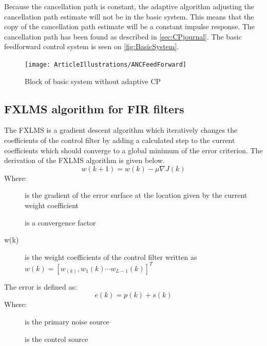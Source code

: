 Because the cancellation path is constant, the adaptive algorithm adjusting the cancellation path estimate will not be in the basic system. This means that the copy of the cancellation path estimate will be a constant impulse response. The cancellation path has been found as described in \autoref{sec:CPjournal}. The basic feedforward control system is seen on \autoref{fig:BasicSystem}. 

\begin{figure}[H]
	\centering
	\texttt{[image: ArticleIllustrations/ANCFeedForward]}
	\caption{Block of basic system without adaptive CP}
	\label{fig:BasicSystem}
\end{figure}   






\subsection{FXLMS algorithm for FIR filters}\label{subsec:fxlms}
The FXLMS is a gradient descent algorithm which iteratively changes the coefficients of the control filter by adding a calculated step to the current coefficients which should converge to a global minimum of the error criterion. The derivation of the FXLMS algorithm is given below. 
\begin{equation}\label{eq:FXLMSNewCoef}
w(k+1) = w(k) - \mu\nabla J(k)
\end{equation}
Where:
\begin{description}
	\item[] is the gradient of the error surface at the location given by the current weight coefficient
	\item[\text{$\mu$}] is a convergence factor
	\item[w(k)] is the weight coefficients of the control filter written as  $w(k)=[w_(k),w_1(k) \cdots w_{L-1}(k)]^T$
\end{description}
The error is defined as:
\begin{equation}\label{eq:FXLMSError}
e(k) = p(k) + s(k)
\end{equation}
Where:
\begin{description}
	\item[] is the primary noise source
	\item[] is the control source
\end{description}


